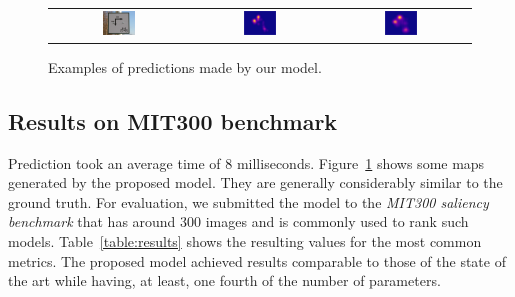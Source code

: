 \documentclass[10pt,twocolumn,letterpaper]{article}
\begin{document}
\begin{figure}
\begin{center}
\begin{tabular} {ccc}
    \includegraphics[width=0.25\textwidth]{./img/sign_s.jpg} &
    \includegraphics[width=0.25\textwidth]{./img/sign_gt.jpg} &
    \includegraphics[width=0.25\textwidth]{./img/sign_m.jpg}\\
    \end{tabular}
\end{center}
    \caption{Examples of predictions made by our model.}
    \label{fig:preds}
\end{figure}

\subsection{Results on MIT300 benchmark}
Prediction took an average time of 8 milliseconds. Figure~\ref{fig:preds} shows some maps generated by the proposed model.
They are generally considerably similar to the ground truth. For evaluation, we submitted the model to the \emph{MIT300 saliency benchmark} that has around 300 images and is commonly used to rank such models. Table~\ref{table:results} shows the resulting values for the most common metrics.
The proposed model achieved results comparable to those of the state of the art while having, at least, one fourth of the number of parameters.
\end{document}
